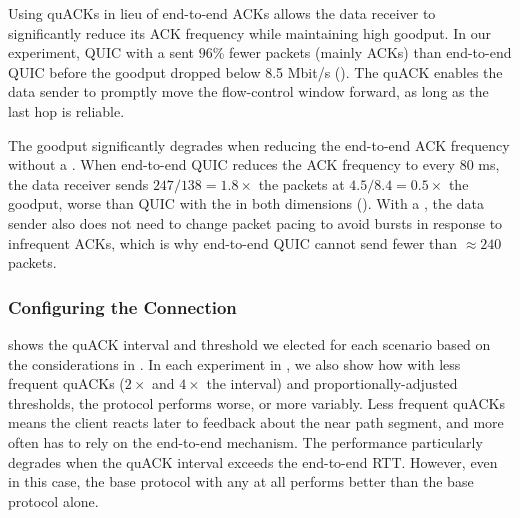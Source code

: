 
Using quACKs in lieu of end-to-end ACKs allows the data receiver to
significantly reduce its ACK frequency while maintaining high goodput.
In our experiment, QUIC with a \sys sent $96\%$ fewer packets (mainly ACKs)
than end-to-end QUIC before the goodput dropped below 8.5 Mbit/s
().
The quACK enables the data sender to promptly move the flow-control window forward,
as long as the last hop is reliable.

The goodput significantly degrades when reducing the end-to-end ACK frequency
without a \sys. When end-to-end QUIC reduces the ACK frequency to every
80 ms, the data receiver sends $247 / 138 = 1.8\times$ the packets at
$4.5 / 8.4 = 0.5\times$ the goodput, worse than QUIC with the \sys
in both dimensions (). With a \sys,
the data sender also does not need to change packet pacing to avoid bursts in
response to infrequent ACKs, which is why end-to-end QUIC cannot send fewer
than $\approx 240$ packets.

\subsubsection{Configuring the \Sys Connection}
 shows the quACK interval and threshold we
elected for each scenario based on the considerations in
. In each experiment in ,
we also show how with
less frequent quACKs ($2\times$ and $4\times$ the interval) and
proportionally-adjusted thresholds, the protocol performs worse, or more
variably.
Less frequent quACKs means the client reacts later to feedback about
the near path segment, and more often has to rely on the end-to-end mechanism.
The performance particularly degrades when the quACK interval exceeds the
end-to-end RTT.
%
%
However, even in this case, the base protocol with any \sys at all performs
better than the base protocol alone\@.

